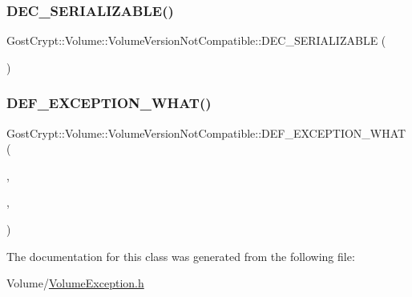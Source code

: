 \subsubsection{\texorpdfstring{D\+E\+C\+\_\+\+S\+E\+R\+I\+A\+L\+I\+Z\+A\+B\+L\+E()}{DEC\_SERIALIZABLE()}}
{\footnotesize\ttfamily Gost\+Crypt\+::\+Volume\+::\+Volume\+Version\+Not\+Compatible\+::\+D\+E\+C\+\_\+\+S\+E\+R\+I\+A\+L\+I\+Z\+A\+B\+LE (\begin{DoxyParamCaption}\item[{\hyperlink{class_gost_crypt_1_1_volume_1_1_volume_version_not_compatible}{Volume\+Version\+Not\+Compatible}}]{ }\end{DoxyParamCaption})}

\mbox{\label{class_gost_crypt_1_1_volume_1_1_volume_version_not_compatible_a2a996c66974887bd046e5d14ab7e0ab8}} 
\subsubsection{\texorpdfstring{D\+E\+F\+\_\+\+E\+X\+C\+E\+P\+T\+I\+O\+N\+\_\+\+W\+H\+A\+T()}{DEF\_EXCEPTION\_WHAT()}}
{\footnotesize\ttfamily Gost\+Crypt\+::\+Volume\+::\+Volume\+Version\+Not\+Compatible\+::\+D\+E\+F\+\_\+\+E\+X\+C\+E\+P\+T\+I\+O\+N\+\_\+\+W\+H\+AT (\begin{DoxyParamCaption}\item[{\hyperlink{class_gost_crypt_1_1_volume_1_1_volume_version_not_compatible}{Volume\+Version\+Not\+Compatible}}]{,  }\item[{\hyperlink{class_gost_crypt_1_1_volume_1_1_volume_exception}{Volume\+Exception}}]{,  }\item[{\char`\"{}The volume version is not compatible with this version of Gost\+Crypt (\char`\"{}+comment+\char`\"{})\char`\"{}}]{ }\end{DoxyParamCaption})}



The documentation for this class was generated from the following file\+:\begin{DoxyCompactItemize}
\item 
Volume/\hyperlink{_volume_exception_8h}{Volume\+Exception.\+h}\end{DoxyCompactItemize}
